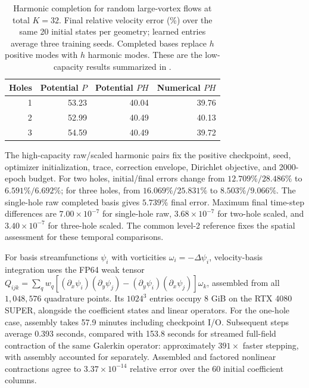 \begin{table}[!htb]\centering\small
\caption{Harmonic completion for random large-vortex flows at total $K=32$. Final relative velocity error (\%) over the same 20 initial states per geometry; learned entries average three training seeds. Completed bases replace $h$ positive modes with $h$ harmonic modes. These are the low-capacity results summarized in .}
\label{tab:prescribed32-summary}
\begin{tabular}{rrrr}\toprule
{Holes}&{Potential $P$}&{Potential $PH$}&{Numerical $PH$}\\\midrule
{1}&{53.23}&{40.04}&{39.76}\\
{2}&{52.99}&{40.49}&{40.13}\\
{3}&{54.59}&{40.49}&{39.72}\\\bottomrule
\end{tabular}\end{table}

The high-capacity raw/scaled harmonic pairs fix the positive checkpoint, seed, optimizer initialization, trace, correction envelope, Dirichlet objective, and 2000-epoch budget. For two holes, initial/final errors change from $12.709\%/28.486\%$ to $6.591\%/6.692\%$; for three holes, from $16.069\%/25.831\%$ to $8.503\%/9.066\%$. The single-hole raw completed basis gives $5.739\%$ final error. Maximum final time-step differences are $7.00\times10^{-7}$ for single-hole raw, $3.68\times10^{-7}$ for two-hole scaled, and $3.40\times10^{-7}$ for three-hole scaled. The common level-2 reference fixes the spatial assessment for these temporal comparisons.

For basis streamfunctions $\psi_i$ with vorticities $\omega_i=-\Delta\psi_i$, velocity-basis integration uses the FP64 weak tensor $Q_{ijk}=\sum_q w_q[(\partial_x\psi_i)(\partial_y\psi_j)-(\partial_y\psi_i)(\partial_x\psi_j)]\omega_k$, assembled from all $1{,}048{,}576$ quadrature points. Its $1024^3$ entries occupy 8 GiB on the RTX 4080 SUPER, alongside the coefficient states and linear operators. For the one-hole case, assembly takes 57.9 minutes including checkpoint I/O. Subsequent steps average 0.393 seconds, compared with 153.8 seconds for streamed full-field contraction of the same Galerkin operator: approximately $391\times$ faster stepping, with assembly accounted for separately. Assembled and factored nonlinear contractions agree to $3.37\times10^{-14}$ relative error over the 60 initial coefficient columns.



